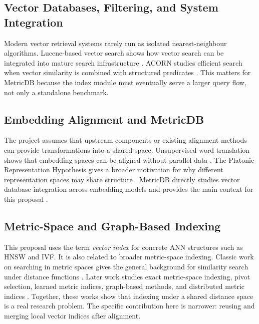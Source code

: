 \documentclass[11pt]{article}
\begin{document}
\subsection{Vector Databases, Filtering, and System Integration}

Modern vector retrieval systems rarely run as isolated nearest-neighbour algorithms. Lucene-based vector search shows how vector search can be integrated into mature search infrastructure \cite{lin2023lucene}. ACORN studies efficient search when vector similarity is combined with structured predicates \cite{patel2024acorn}. This matters for MetricDB because the index module must eventually serve a larger query flow, not only a standalone benchmark.

\subsection{Embedding Alignment and MetricDB}

The project assumes that upstream components or existing alignment methods can provide transformations into a shared space. Unsupervised word translation shows that embedding spaces can be aligned without parallel data \cite{conneau2018word}. The Platonic Representation Hypothesis gives a broader motivation for why different representation spaces may share structure \cite{huh2024platonic}. MetricDB directly studies vector database integration across embedding models and provides the main context for this proposal \cite{yang2025integrating}.

\subsection{Metric-Space and Graph-Based Indexing}

This proposal uses the term \emph{vector index} for concrete ANN structures such as HNSW and IVF. It is also related to broader metric-space indexing. Classic work on searching in metric spaces gives the general background for similarity search under distance functions \cite{chavez2001searching}. Later work studies exact metric-space indexing, pivot selection, learned metric indices, graph-based methods, and distributed metric indices \cite{chen2022indexing,zhu2022pivot,tian2022lims,antol2021learned,shimomura2021survey,zhu2024dims}. Together, these works show that indexing under a shared distance space is a real research problem. The specific contribution here is narrower: reusing and merging local vector indices after alignment.
\end{document}
